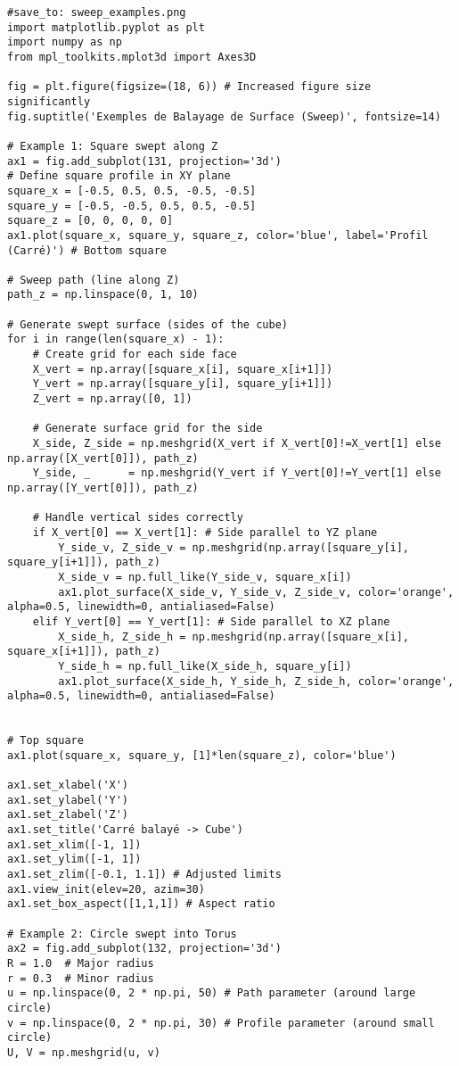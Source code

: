 \documentclass{article}
\begin{document}
\begin{verbatim}
#save_to: sweep_examples.png
import matplotlib.pyplot as plt
import numpy as np
from mpl_toolkits.mplot3d import Axes3D

fig = plt.figure(figsize=(18, 6)) # Increased figure size significantly
fig.suptitle('Exemples de Balayage de Surface (Sweep)', fontsize=14)

# Example 1: Square swept along Z
ax1 = fig.add_subplot(131, projection='3d')
# Define square profile in XY plane
square_x = [-0.5, 0.5, 0.5, -0.5, -0.5]
square_y = [-0.5, -0.5, 0.5, 0.5, -0.5]
square_z = [0, 0, 0, 0, 0]
ax1.plot(square_x, square_y, square_z, color='blue', label='Profil (Carré)') # Bottom square

# Sweep path (line along Z)
path_z = np.linspace(0, 1, 10)

# Generate swept surface (sides of the cube)
for i in range(len(square_x) - 1):
    # Create grid for each side face
    X_vert = np.array([square_x[i], square_x[i+1]])
    Y_vert = np.array([square_y[i], square_y[i+1]])
    Z_vert = np.array([0, 1])

    # Generate surface grid for the side
    X_side, Z_side = np.meshgrid(X_vert if X_vert[0]!=X_vert[1] else np.array([X_vert[0]]), path_z)
    Y_side, _      = np.meshgrid(Y_vert if Y_vert[0]!=Y_vert[1] else np.array([Y_vert[0]]), path_z)

    # Handle vertical sides correctly
    if X_vert[0] == X_vert[1]: # Side parallel to YZ plane
        Y_side_v, Z_side_v = np.meshgrid(np.array([square_y[i], square_y[i+1]]), path_z)
        X_side_v = np.full_like(Y_side_v, square_x[i])
        ax1.plot_surface(X_side_v, Y_side_v, Z_side_v, color='orange', alpha=0.5, linewidth=0, antialiased=False)
    elif Y_vert[0] == Y_vert[1]: # Side parallel to XZ plane
        X_side_h, Z_side_h = np.meshgrid(np.array([square_x[i], square_x[i+1]]), path_z)
        Y_side_h = np.full_like(X_side_h, square_y[i])
        ax1.plot_surface(X_side_h, Y_side_h, Z_side_h, color='orange', alpha=0.5, linewidth=0, antialiased=False)


# Top square
ax1.plot(square_x, square_y, [1]*len(square_z), color='blue')

ax1.set_xlabel('X')
ax1.set_ylabel('Y')
ax1.set_zlabel('Z')
ax1.set_title('Carré balayé -> Cube')
ax1.set_xlim([-1, 1])
ax1.set_ylim([-1, 1])
ax1.set_zlim([-0.1, 1.1]) # Adjusted limits
ax1.view_init(elev=20, azim=30)
ax1.set_box_aspect([1,1,1]) # Aspect ratio

# Example 2: Circle swept into Torus
ax2 = fig.add_subplot(132, projection='3d')
R = 1.0  # Major radius
r = 0.3  # Minor radius
u = np.linspace(0, 2 * np.pi, 50) # Path parameter (around large circle)
v = np.linspace(0, 2 * np.pi, 30) # Profile parameter (around small circle)
U, V = np.meshgrid(u, v)


\end{verbatim}
\end{document}
